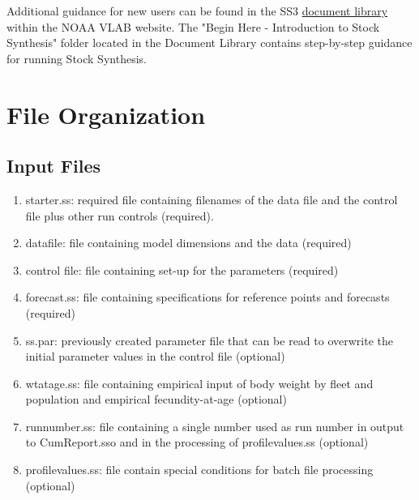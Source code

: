 Additional guidance for new users can be found in the SS3 \href{https://vlab.noaa.gov/group/stock-synthesis/document-library}{document library} within the NOAA VLAB website.  The "Begin Here - Introduction to Stock Synthesis" folder located in the Document Library contains step-by-step guidance for running Stock Synthesis.  

\pagebreak
		
\section{File Organization}\label{FileOrganization}		
	\subsection{Input Files}
	\begin{enumerate}
		\item starter.ss: required file containing filenames of the data file and the control file plus other run controls (required).
		\item datafile: file containing model dimensions and the data (required)
		\item control file: file containing set-up for the parameters (required)
		\item forecast.ss: file containing specifications for reference points and forecasts (required) 
		\item ss.par: previously created parameter file that can be read to overwrite the initial parameter values in the control file (optional)
		\item wtatage.ss: file containing empirical input of body weight by fleet and population and empirical fecundity-at-age (optional)
		\item runnumber.ss: file containing a single number used as run number in output to CumReport.sso and in the processing of profilevalues.ss (optional)
		\item profilevalues.ss: file contain special conditions for batch file processing (optional)
	\end{enumerate}
	
